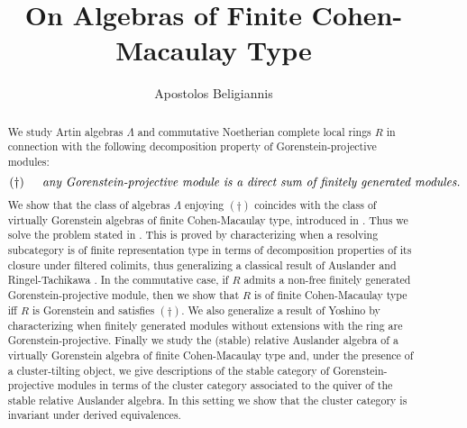 \documentclass[oneside, a4paper,reqno]{amsart}
\numberwithin{equation}{section}
\theoremstyle{definition}
\begin{document}
\title[On Algebras of Finite CM-Type]{On Algebras of Finite Cohen-Macaulay Type}

\author[A. Beligiannis]{Apostolos Beligiannis}
\address{Department of Mathematics, University of Ioannina, GR-45110
Ioannina, Greece}




\begin{abstract}
We study Artin algebras $\Lambda$ and commutative Noetherian
complete local rings $R$ in connection with the following
decomposition  property of Gorenstein-projective modules:
\[(\dagger) \,\, \,\,\,\,\,\ \text{\em any Gorenstein-projective module is a direct sum of
finitely generated modules.}\] We show that the class of algebras
$\Lambda$ enjoying $\mathbf{(\dagger)}$ coincides with the class of
virtually Gorenstein algebras of finite Cohen-Macaulay type,
introduced in \cite{BR, B:cm}. Thus we solve the  problem stated in
\cite{Chen}. This is proved by characterizing when a resolving
 subcategory is of finite representation type
in terms of decomposition properties of its closure under filtered
colimits, thus generalizing a classical result of Auslander
\cite{Auslander:large} and Ringel-Tachikawa \cite{RT}. In the
commutative case, if  $R$ admits a non-free finitely generated
Gorenstein-projective module, then we show that $R$ is of finite
Cohen-Macaulay type iff $R$ is Gorenstein and satisfies $(\dagger)$.
We also generalize
 a result of Yoshino \cite{Yoshino} by
characterizing when finitely generated modules without extensions
with the ring are Gorenstein-projective. Finally we study the
(stable) relative Auslander algebra of a virtually Gorenstein
algebra of finite Cohen-Macaulay type and, under the presence of a
cluster-tilting object, we give descriptions of the stable category
of Gorenstein-projective modules in terms of the cluster category
associated to the quiver of the stable relative Auslander algebra.
In this setting we show that the cluster category is invariant under
derived equivalences.
\end{abstract}

\maketitle
\end{document}
